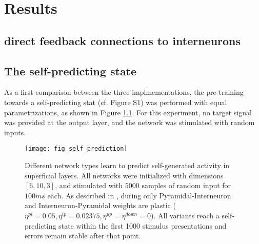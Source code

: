 
\chapter{Results}





\section{direct feedback connections to interneurons}\label{sec-electric-syns}

\cite{Vaughn2022,Mancilla2007}


\section{The self-predicting state}

As a first comparison between the three implmementations, the pre-training towards a self-predicting stat (cf.
\cite{sacramento2018dendritic} Figure S1) was performed with equal parametrizations, as shown in Figure
\ref{fig-self-pred}. For this experiment, no target signal was provided at the output layer, and the network was
stimulated with random inputs.



\begin{figure}[t]
    \centering
    \texttt{[image: fig\_self\_prediction]}
    \caption{Different network types learn to predict self-generated activity in superficial layers. All networks were
        initialized with dimensions $[6, 10, 3]$, and stimulated with $5000$ samples of random input for $100ms$ each.
        As described in \cite{sacramento2018dendritic}, during only Pyramidal-Interneuron and Interneuron-Pyramidal
        weights are plastic ($\eta^{pi}=0.05, \eta^{ip}=0.02375, \eta^{up}=\eta^{down}=0$). All variants reach a
        self-predicting state within the first 1000 stimulus presentations and errors remain stable after that point.}
    \label{fig-self-pred}
\end{figure}


